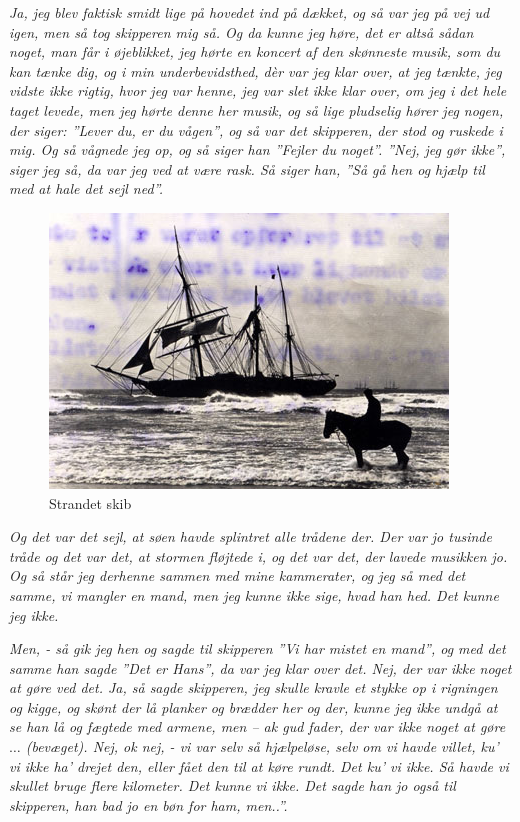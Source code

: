\emph{Ja, jeg blev faktisk smidt lige på hovedet ind på dækket, og så
var jeg på vej ud igen, men så tog skipperen mig så. Og da kunne jeg
høre, det er altså sådan noget, man får i øjeblikket, jeg hørte en
koncert af den skønneste musik, som du kan tænke dig, og i min
underbevidsthed, dèr var jeg klar over, at jeg tænkte, jeg vidste ikke
rigtig, hvor jeg var henne, jeg var slet ikke klar over, om jeg i det
hele taget levede, men jeg hørte denne her musik, og så lige pludselig
hører jeg nogen, der siger: ''Lever du, er du vågen'', og så var det
skipperen, der stod og ruskede i mig. Og så vågnede jeg op, og så siger
han ''Fejler du noget''. ''Nej, jeg gør ikke'', siger jeg så, da var jeg
ved at være rask. Så siger han, ''Så gå hen og hjælp til med at hale det
sejl ned''.}

\begin{figure}
\centering
\includegraphics{images/sejlskibe_tema-6-strandet-s.jpg}
\caption{Strandet skib}
\end{figure}

\emph{Og det var det sejl, at søen havde splintret alle trådene der. Der
var jo tusinde tråde og det var det, at stormen fløjtede i, og det var
det, der lavede musikken jo. Og så står jeg derhenne sammen med mine
kammerater, og jeg så med det samme, vi mangler en mand, men jeg kunne
ikke sige, hvad han hed. Det kunne jeg ikke.}

\emph{Men, - så gik jeg hen og sagde til skipperen ''Vi har mistet en
mand'', og med det samme han sagde ''Det er Hans'', da var jeg klar over
det. Nej, der var ikke noget at gøre ved det. Ja, så sagde skipperen,
jeg skulle kravle et stykke op i rigningen og kigge, og skønt der lå
planker og brædder her og der, kunne jeg ikke undgå at se han lå og
fægtede med armene, men -- ak gud fader, der var ikke noget at gøre
\(\ldots\) (bevæget). Nej, ok nej, - vi var selv så hjælpeløse, selv om
vi havde villet, ku' vi ikke ha' drejet den, eller fået den til at køre
rundt. Det ku' vi ikke. Så havde vi skullet bruge flere kilometer. Det
kunne vi ikke. Det sagde han jo også til skipperen, han bad jo en bøn
for ham, men..''.}

